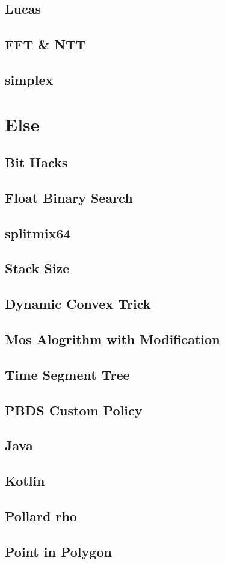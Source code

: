 \subsection{Lucas}

\subsection{FFT \& NTT}

\subsection{simplex}


\section{Else}
\subsection{Bit Hacks}

\subsection{Float Binary Search}

\subsection{splitmix64}

\subsection{Stack Size}

\subsection{Dynamic Convex Trick}

\subsection{Mos Alogrithm with Modification}

\subsection{Time Segment Tree}

\subsection{PBDS Custom Policy}

\subsection{Java}

\subsection{Kotlin}


\newpage
\subsection{Pollard rho}

\subsection{Point in Polygon}

